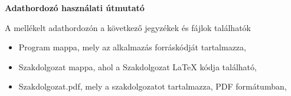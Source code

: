 \pagestyle{empty}

\noindent \textbf{\Large Adathordozó használati útmutató}

\vskip 1cm


A mellékelt adathordozón a következő jegyzékek és fájlok találhatók

\begin{itemize}
\item Program mappa, mely az alkalmazás forráskódját tartalmazza,
\item Szakdolgozat mappa, ahol a Szakdolgozat LaTeX kódja található,
\item Szakdolgozat.pdf, mely a szakdolgozatot tartalmazza, PDF formátumban,
\end{itemize}

